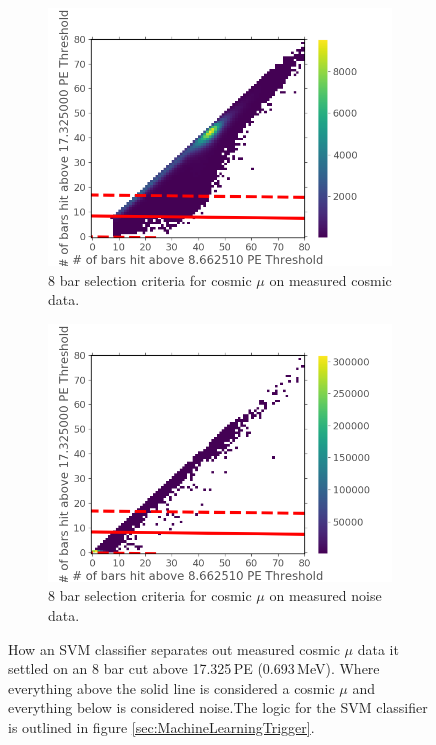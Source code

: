 \begin{figure}[htbp]
\centering
\begin{subfigure}{.5\textwidth}
  \centering
  \includegraphics[width=\linewidth]{Chapter5/Figs/Raster/Cosmic8BarSignalCutSVM.png}
  \captionsetup{width=.9\linewidth}
  \caption{8 bar selection criteria for cosmic $\mu$ on measured cosmic data.}
  \label{subFig:cosmic8BarSignalCutSVM}
\end{subfigure}%
\begin{subfigure}{.5\textwidth}
  \centering
\includegraphics[width=\linewidth]{Chapter5/Figs/Raster/Cosmic8BarNoiseCutSVM.png}
  \captionsetup{width=.9\linewidth}
  \caption{8 bar selection criteria for cosmic $\mu$ on measured noise data.}
  \label{subFig:cosmic8BarNoiseCutSVM}
\end{subfigure}
\caption{How an SVM classifier separates out measured cosmic $\mu$ data it settled on an 8 bar cut above 17.325\,PE (0.693\,MeV). Where everything above the solid line is considered a cosmic $\mu$ and everything below is considered noise.The logic for the SVM classifier is outlined in figure \ref{sec:MachineLearningTrigger}.}
\label{fig:cosmic8BarSignalNoiseCutSVM}
\end{figure}

